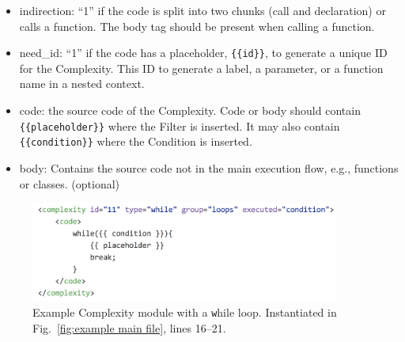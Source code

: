 \documentclass[12pt]{article}
\begin{document}
\begin{itemize}
    \item indirection: ``1'' if the code is split into two chunks (call and
    declaration) or calls a function.  The body tag should be present when 
    calling a function.

    \item need\_id: ``1'' if the code has a placeholder, \verb|{{id}}|,
    to generate a unique ID for the Complexity.  This ID to generate 
    a label, a parameter, or a function name in a nested
    context.

    \item code: the source code of the Complexity.  Code or 
    body should contain \\ \verb|{{placeholder}}|
    where the Filter is inserted.  It may also contain
    \verb|{{condition}}| where the Condition
    is inserted.

    \item body:  Contains the source code not in the main execution 
    flow, e.g., 
    functions or classes. (optional)
\end{itemize}


\begin{figure}[htbp]
  \includegraphics[width=4in]{fig_Complexity_file_while.png}
  \caption{Example Complexity module with a {\texttt while} loop.  Instantiated in 
    Fig.~\ref{fig:example main file}, lines 16--21.}
  \label{fig:example complexity-while file}
\end{figure}
\end{document}
